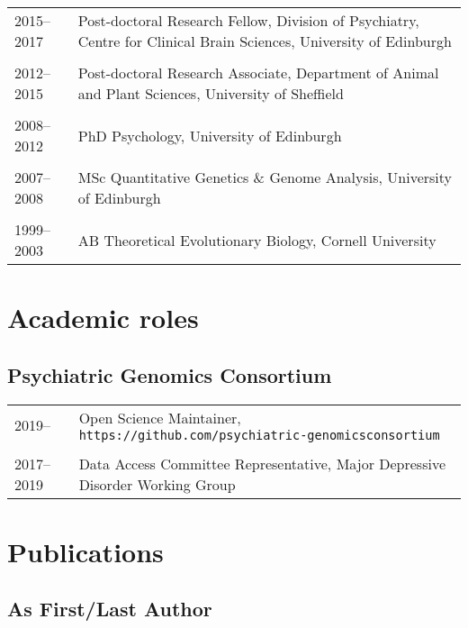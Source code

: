 \documentclass[11pt]{article}
\begin{document}
\begin{tabular}{p{3cm}p{12cm}}
2015--2017 & Post-doctoral Research Fellow, Division of Psychiatry, Centre for Clinical Brain Sciences, University of Edinburgh \\ \\

2012--2015 & Post-doctoral Research Associate, Department of Animal and Plant Sciences, University of Sheffield \\ \\

2008--2012 & PhD Psychology, University of Edinburgh \\ \\

2007--2008 & MSc Quantitative Genetics \& Genome Analysis, University of Edinburgh \\ \\

1999–2003 & AB Theoretical Evolutionary Biology, Cornell University

\end{tabular}

\section*{Academic roles}

\subsection*{Psychiatric Genomics Consortium}

\begin{tabular}{p{3cm}p{12cm}}
2019-- & Open Science Maintainer, \texttt{https://github.com/psychiatric-genomics\-consortium} \\ \\

2017--2019 & Data Access Committee Representative, Major Depressive Disorder Working Group 

\end{tabular}

\newpage

\section*{Publications}

\subsection*{As First/Last Author}
\end{document}

